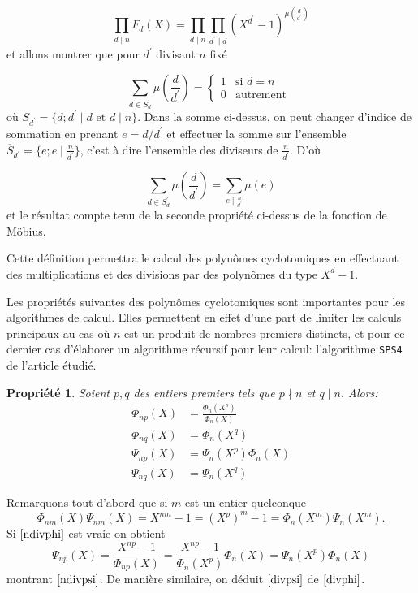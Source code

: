 \documentclass{article}
\theoremstyle{break}                  %
\newtheorem{propriete}{Propriété}
\begin{document}
$$\prod_{ d \mid n} F_d(X) = \prod_{ d \mid n} \prod_{d^\prime \mid d} (X^{d^\prime} - 1)^{\mu(\frac{d}{d^\prime})}$$ et allons montrer que pour $d^\prime$ divisant $n$ fixé

$$\sum_{d \in S_d^\prime} \mu\left(\frac{d}{d^\prime}\right)=\begin{cases}1 &\text{si } d= n\\
	0 &\text{autrement }\end{cases}$$ où $S_{d^\prime} = \{d ; d^\prime \mid d \text{ et } d \mid n\}$.
Dans la somme ci-dessus, on peut changer d'indice de sommation en prenant $e = d/d^\prime$ et effectuer la somme sur l'ensemble $\overline{S}_{d^\prime} = \{e ; e \mid \frac{n}{d^\prime}\}$, c'est à dire l'ensemble des diviseurs de $\frac{n}{d^\prime}$. D'où

$$\sum_{d \in S_d^\prime} \mu\left(\frac{d}{d^\prime}\right) = \sum_{e \mid \frac{n}{d^\prime}} \mu(e)$$ et le résultat compte tenu de la seconde propriété ci-dessus de la fonction de Möbius.

Cette définition permettra le calcul des polynômes cyclotomiques en effectuant des multiplications et des divisions par des polynômes du type $X^d - 1$.

Les propriétés suivantes des polynômes cyclotomiques sont importantes pour les algorithmes de calcul. Elles permettent en effet d'une part de limiter les calculs principaux au cas où $n$ est un produit de nombres premiers distincts, et pour ce dernier cas d'élaborer un algorithme récursif pour leur calcul: l'algorithme \texttt{SPS4} de l'article étudié.


\begin{propriete}
	Soient $p,q$ des entiers premiers tels que $p \nmid n$ et $q \mid n$. Alors:
	\begin{align}
		\Phi_{np}(X) &= \frac{\Phi_n(X^p)}{\Phi_n(X)} \tag{2.8a}\label{ndivphi}\\
		\Phi_{nq}(X) &= \Phi_n(X^q) \tag{2.8b}\label{divphi}\\
		\Psi_{np}(X) &= \Psi_n(X^p)\Phi_n(X) \tag{2.8c}\label{ndivpsi}\\
		\Psi_{nq}(X) &= \Psi_n(X^q)	 \tag{2.8d}\label{divpsi}
	\end{align}
\end{propriete}

Remarquons tout d'abord que si $m$ est un entier quelconque
$$\Phi_{nm}(X) \Psi_{nm}(X) = X^{nm}-1 = (X^p)^m-1=\Phi_{n}(X^m) \Psi_{n}(X^m).$$ Si $\ref{ndivphi}$ est vraie on obtient
$$\Psi_{np}(X) = \frac{X^{np}-1}{\Phi_{np}(X)} =\frac{X^{np}-1}{\Phi_{n}(X^p)}\Phi_n(X)=\Psi_n(X^p)\Phi_n(X)$$ montrant $\ref{ndivpsi}$. De manière similaire, on déduit $\ref{divpsi}$ de $\ref{divphi}$.\\
\end{document}
